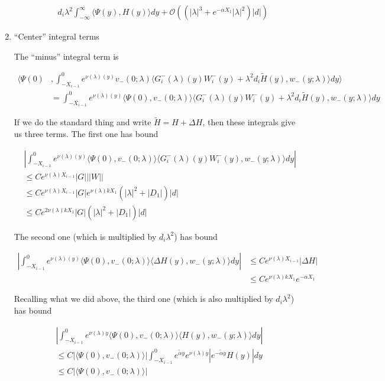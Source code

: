 \documentclass[12pt]{article}
\begin{document}
\begin{enumerate}
\begin{enumerate}[(i)]
\begin{align*}
d_i \lambda^2 \int_{-\infty}^\infty \langle \Psi(y), H(y) \rangle dy + \mathcal{O}( ( |\lambda|^3 + e^{-\alpha X_1} |\lambda|^2 )|d|)
\end{align*}

\end{enumerate}

\item ``Center'' integral terms

The ``minus'' integral term is

\begin{align*}
\langle \Psi(0) &, \int_{-X_{i-1}}^0
e^{\nu(\lambda)(y)} v_-(0; \lambda) \langle G_i^-(\lambda)(y)W_i^-(y) + \lambda^2 d_i \tilde{H}(y), w_-(y; \lambda) \rangle dy \rangle \\
&= \int_{-X_{i-1}}^0
e^{\nu(\lambda)(y)} \langle \Psi(0), v_-(0; \lambda) \rangle \langle G_i^-(\lambda)(y)W_i^-(y) + \lambda^2 d_i \tilde{H}(y), w_-(y; \lambda) \rangle dy 
\end{align*}

If we do the standard thing and write $\tilde{H} = H + \Delta H$, then these integrals give us three terms. The first one has bound

\begin{align*}
&\left| \int_{-X_{i-1}}^0
e^{\nu(\lambda)(y)} \langle \Psi(0), v_-(0; \lambda) \rangle \langle G_i^-(\lambda)(y)W_i^-(y), w_-(y; \lambda) \rangle dy \right| \\
&\leq C e^{\nu(\lambda) X_{i-1}} |G| ||W|| \\
&\leq C e^{\nu(\lambda) X_{i-1}} |G| e^{\nu(\lambda)k X_1} ( |\lambda|^2 + |D_1| )|d| \\
&\leq C e^{2 \nu(\lambda) k X_1} |G| ( |\lambda|^2 + |D_1| )|d|
\end{align*}

The second one (which is multiplied by $d_i \lambda^2$) has bound

\begin{align*}
\left| \int_{-X_{i-1}}^0
e^{\nu(\lambda)(y)} \langle \Psi(0), v_-(0; \lambda) \rangle \langle \Delta H(y), w_-(y; \lambda) \rangle dy \right| 
&\leq C e^{\nu(\lambda)X_{i-1}} |\Delta H| \\
&\leq C e^{\nu(\lambda)k X_1} e^{-\alpha X_1}
\end{align*}

Recalling what we did above, the third one (which is also multiplied by $d_i \lambda^2$) has bound

\begin{align*}
&\left| \int_{-X_{i-1}}^0 e^{\nu(\lambda)y} \langle \Psi(0), v_-(0; \lambda) \rangle
\langle H(y), w_-(y; \lambda) \rangle dy \right| \\
&\leq C |\langle \Psi(0), v_-(0; \lambda) \rangle| \int_{-X_{i-1}}^0 e^{\tilde{\alpha}y}e^{\nu(\lambda)y} | e^{-\tilde{\alpha} y} H(y)|dy\\
&\leq C |\langle \Psi(0), v_-(0; \lambda) \rangle|
\end{align*}


\end{enumerate}
\end{document}
